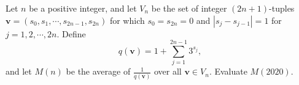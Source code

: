 Let $n$ be a positive integer, and let $V_n$ be the set of integer $(2n+1)$-tuples $\mathbf{v} = (s_0, s_1, \cdots, s_{2n-1}, s_{2n})$ for which $s_0 = s_{2n} = 0$ and $|s_j - s_{j-1}| = 1$ for $j=1,2,\cdots,2n$. Define
\[
q(\mathbf{v}) = 1 + \sum_{j=1}^{2n-1} 3^{s_j},
\]
and let $M(n)$ be the average of $\frac{1}{q(\mathbf{v})}$ over all $\mathbf{v} \in V_n$. Evaluate $M(2020)$.

